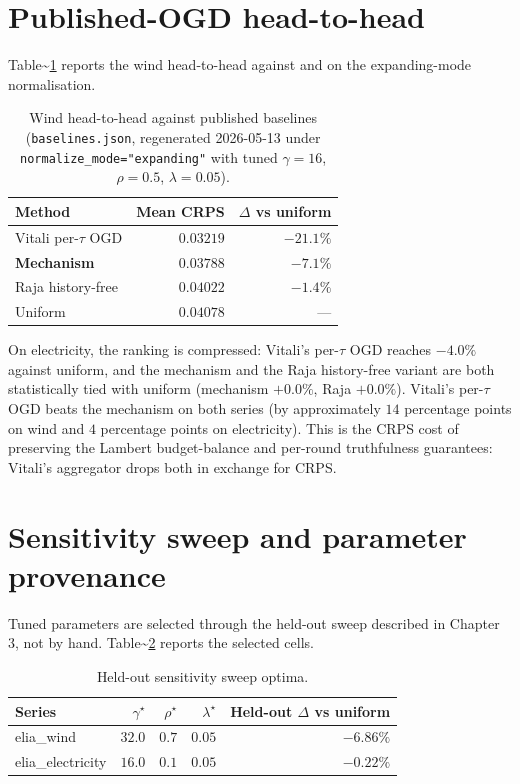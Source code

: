 \documentclass[
  11pt,
  a4paper,
  oneside]{report}
\begin{document}
\section{Published-OGD head-to-head}\label{published-ogd-head-to-head}

Table\textasciitilde{}\ref{tab:head-to-head-wind} reports the wind
head-to-head against \citet{vitali2025intermittent} and
\citet{raja2024wagering} on the expanding-mode normalisation.

\begin{table}[h]
\centering
\small
\begin{tabular}{lrr}
\toprule
Method & Mean CRPS & $\Delta$ vs uniform \\
\midrule
Vitali per-$\tau$ OGD & $0.03219$ & $-21.1\%$ \\
\textbf{Mechanism} & $\mathbf{0.03788}$ & $\mathbf{-7.1\%}$ \\
Raja history-free & $0.04022$ & $-1.4\%$ \\
Uniform & $0.04078$ & --- \\
\bottomrule
\end{tabular}
\caption{Wind head-to-head against published baselines
(\texttt{baselines.json}, regenerated 2026-05-13 under
\texttt{normalize\_mode="expanding"} with tuned $\gamma=16$,
$\rho=0.5$, $\lambda=0.05$).}
\label{tab:head-to-head-wind}
\end{table}

On electricity, the ranking is compressed: Vitali's per-\(\tau\) OGD
reaches \(-4.0\%\) against uniform, and the mechanism and the Raja
history-free variant are both statistically tied with uniform
(mechanism \(+0.0\%\), Raja \(+0.0\%\)). Vitali's per-\(\tau\) OGD
beats the mechanism on both series (by approximately \(14\)
percentage points on wind and \(4\) percentage points on
electricity). This is the CRPS cost of preserving the Lambert
budget-balance and per-round truthfulness guarantees: Vitali's
aggregator drops both in exchange for CRPS.

\section{Sensitivity sweep and parameter
provenance}\label{sensitivity-sweep-and-parameter-provenance}

Tuned parameters are selected through the held-out sweep described in
Chapter 3, not by hand.
Table\textasciitilde{}\ref{tab:sensitivity-sweep} reports the selected
cells.

\begin{table}[h]
\centering
\small
\begin{tabular}{lrrrr}
\toprule
Series & $\gamma^\star$ & $\rho^\star$ & $\lambda^\star$
  & Held-out $\Delta$ vs uniform \\
\midrule
elia\_wind & $32.0$ & $0.7$ & $0.05$ & $-6.86\%$ \\
elia\_electricity & $16.0$ & $0.1$ & $0.05$ & $-0.22\%$ \\
\bottomrule
\end{tabular}
\caption{Held-out sensitivity sweep optima.}
\label{tab:sensitivity-sweep}
\end{table}
\end{document}
